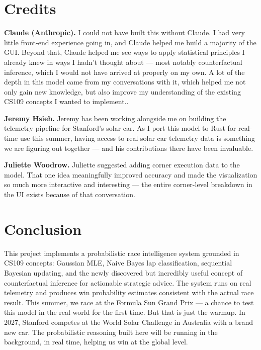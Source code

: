 \documentclass[10pt,twocolumn]{article}
\begin{document}
\section{Credits}

\textbf{Claude (Anthropic).} I could not have built this without Claude. I had
very little front-end experience going in, and Claude helped me build a majority of the
GUI. Beyond that, Claude helped me see ways to apply statistical principles I
already knew in ways I hadn't thought about --- most notably counterfactual
inference, which I would not have arrived at properly on my own. A lot of the
depth in this model came from my conversations with it, which helped me not only gain new knowledge, but also improve my understanding of the existing CS109 concepts I wanted to implement..

\textbf{Jeremy Hsieh.} Jeremy has been working alongside me on building the
telemetry pipeline for Stanford's solar car. As I port this model to Rust for
real-time use this summer, having access to real solar car telemetry data is
something we are figuring out together --- and his contributions there have been
invaluable.

\textbf{Juliette Woodrow.} Juliette suggested adding corner execution data to the
model. That one idea meaningfully improved accuracy and made the visualization
so much more interactive and interesting --- the entire corner-level breakdown in
the UI exists because of that conversation.

\section{Conclusion}

This project implements a probabilistic race intelligence system grounded
in CS109 concepts: Gaussian MLE, Naive Bayes lap classification, sequential
Bayesian updating, and the newly discovered but incredibly useful concept of
counterfactual inference for actionable strategic advice. The system runs on real
telemetry and produces win probability estimates consistent with the actual race
result. This summer, we race at the Formula Sun Grand Prix --- a chance to test
this model in the real world for the first time. But that is just the warmup.
In 2027, Stanford competes at the World Solar Challenge in Australia with a
brand new car. The probabilistic reasoning built here will be running in the
background, in real time, helping us win at the global level.
\end{document}
